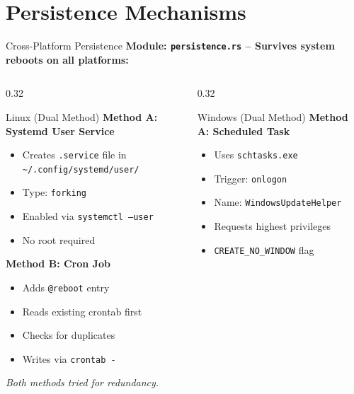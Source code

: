 \documentclass[aspectratio=169]{beamer}
\newcommand{\code}[1]{\texttt{\textcolor{primaryblue}{#1}}}
\begin{document}
\section{Persistence Mechanisms}

\begin{frame}{Cross-Platform Persistence}
  \textbf{Module: \code{persistence.rs} -- Survives system reboots on all platforms:}

  \vspace{0.5em}
  \begin{columns}[T]
    \begin{column}{0.32\textwidth}
      \begin{block}{Linux (Dual Method)}
        \footnotesize
        \textbf{Method A: Systemd User Service}
        \begin{itemize}
          \item Creates \code{.service} file in \code{\textasciitilde/.config/systemd/user/}
          \item Type: \code{forking}
          \item Enabled via \code{systemctl --user}
          \item No root required
        \end{itemize}

        \vspace{0.3em}
        \textbf{Method B: Cron Job}
        \begin{itemize}
          \item Adds \code{@reboot} entry
          \item Reads existing crontab first
          \item Checks for duplicates
          \item Writes via \code{crontab -}
        \end{itemize}

        \textit{Both methods tried for redundancy.}
      \end{block}
    \end{column}
    \begin{column}{0.32\textwidth}
      \begin{block}{Windows (Dual Method)}
        \footnotesize
        \textbf{Method A: Scheduled Task}
        \begin{itemize}
          \item Uses \code{schtasks.exe}
          \item Trigger: \code{onlogon}
          \item Name: \code{WindowsUpdateHelper}
          \item Requests highest privileges
          \item \code{CREATE\_NO\_WINDOW} flag
        \end{itemize}


\end{block}
\end{column}
\end{columns}
\end{frame}
\end{document}
